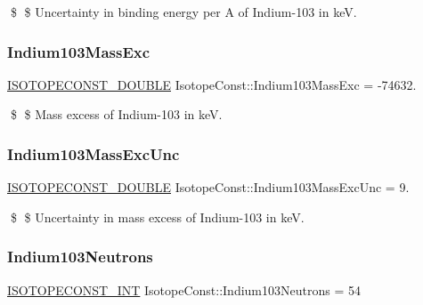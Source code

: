 \$ \$ Uncertainty in binding energy per A of Indium-\/103 in keV. \mbox{\label{group___isotope_const-_indium-_in103_ga61677aefd941074749ae189fe3528e53}} 
\subsubsection{\texorpdfstring{Indium103\+Mass\+Exc}{Indium103MassExc}}
{\footnotesize\ttfamily \mbox{\hyperlink{group___isotope_const-_macros_ga8f45a7272ce02c0b4c65c44636ed719a}{I\+S\+O\+T\+O\+P\+E\+C\+O\+N\+S\+T\+\_\+\+D\+O\+U\+B\+LE}} Isotope\+Const\+::\+Indium103\+Mass\+Exc = -\/74632.}

\$ \$ Mass excess of Indium-\/103 in keV. \mbox{\label{group___isotope_const-_indium-_in103_gadfc7ae63efea6c82aac69f8bbcf34299}} 
\subsubsection{\texorpdfstring{Indium103\+Mass\+Exc\+Unc}{Indium103MassExcUnc}}
{\footnotesize\ttfamily \mbox{\hyperlink{group___isotope_const-_macros_ga8f45a7272ce02c0b4c65c44636ed719a}{I\+S\+O\+T\+O\+P\+E\+C\+O\+N\+S\+T\+\_\+\+D\+O\+U\+B\+LE}} Isotope\+Const\+::\+Indium103\+Mass\+Exc\+Unc = 9.}

\$ \$ Uncertainty in mass excess of Indium-\/103 in keV. \mbox{\label{group___isotope_const-_indium-_in103_gafca4c5d341d03d983d61c543bccb492f}} 
\subsubsection{\texorpdfstring{Indium103\+Neutrons}{Indium103Neutrons}}
{\footnotesize\ttfamily \mbox{\hyperlink{group___isotope_const-_macros_ga5f18360b3e99483a35c32d789e62621c}{I\+S\+O\+T\+O\+P\+E\+C\+O\+N\+S\+T\+\_\+\+I\+NT}} Isotope\+Const\+::\+Indium103\+Neutrons = 54}

